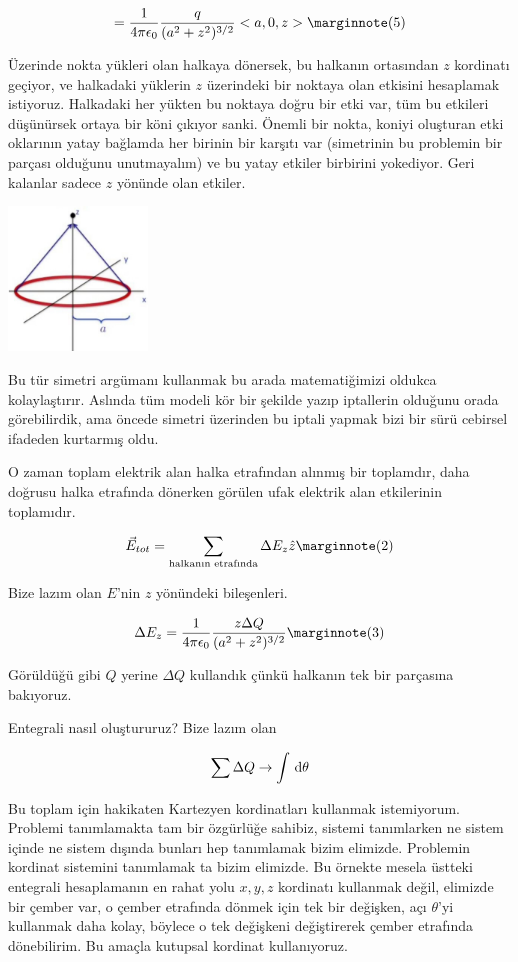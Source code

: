 \documentclass[12pt,fleqn]{article}\usepackage{../../common}
\begin{document}
$$ 
= \frac{1}{4\pi\epsilon_0 }  \frac{q}{(a^2 + z^2)^{3/2}}  < a,0,z > 
\mlabel{5}
$$ 

Üzerinde nokta yükleri olan halkaya dönersek, bu halkanın ortasından $z$
kordinatı geçiyor, ve halkadaki yüklerin $z$ üzerindeki bir noktaya olan
etkisini hesaplamak istiyoruz. Halkadaki her yükten bu noktaya doğru bir etki
var, tüm bu etkileri düşünürsek ortaya bir köni çıkıyor sanki. Önemli bir nokta,
koniyi oluşturan etki oklarının yatay bağlamda her birinin bir karşıtı var
(simetrinin bu problemin bir parçası olduğunu unutmayalım) ve bu yatay etkiler
birbirini yokediyor. Geri kalanlar sadece $z$ yönünde olan etkiler. 
    
\includegraphics[width=10em]{06_05.jpg}

Bu tür simetri argümanı kullanmak bu arada matematiğimizi oldukca
kolaylaştırır. Aslında tüm modeli kör bir şekilde yazıp iptallerin olduğunu
orada görebilirdik, ama öncede simetri üzerinden bu iptali yapmak bizi bir sürü
cebirsel ifadeden kurtarmış oldu. 

O zaman toplam elektrik alan halka etrafından alınmış bir toplamdır, daha
doğrusu halka etrafında dönerken görülen ufak elektrik alan etkilerinin
toplamıdır.

$$
\vec{E}_{tot} = \sum_{\textrm{halkanın etrafında}} \Delta E_z \hat{z} 
\mlabel{2}
$$

Bize lazım olan $E$'nin $z$ yönündeki bileşenleri. 

$$
\Delta E_z =
\frac{1}{4\pi\epsilon_0 }
\frac{z \Delta Q}{(a^2 + z^2)^{3/2}}
\mlabel{3}
$$

Görüldüğü gibi $Q$ yerine $\Delta Q$ kullandık çünkü halkanın tek bir parçasına
bakıyoruz.

Entegrali nasıl oluştururuz? Bize lazım olan

$$
\sum \Delta Q \to \int \,\mathrm{d} \theta
$$

Bu toplam için hakikaten Kartezyen kordinatları kullanmak istemiyorum. Problemi
tanımlamakta tam bir özgürlüğe sahibiz, sistemi tanımlarken ne sistem içinde ne
sistem dışında bunları hep tanımlamak bizim elimizde. Problemin kordinat
sistemini tanımlamak ta bizim elimizde. Bu örnekte mesela üstteki entegrali
hesaplamanın en rahat yolu $x,y,z$ kordinatı kullanmak değil, elimizde bir
çember var, o çember etrafında dönmek için tek bir değişken, açı $\theta$'yi
kullanmak daha kolay, böylece o tek değişkeni değiştirerek çember etrafında
dönebilirim. Bu amaçla kutupsal kordinat kullanıyoruz.
\end{document}
